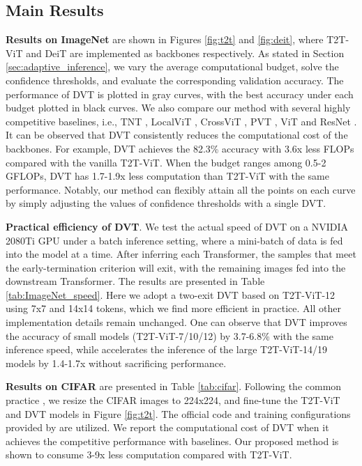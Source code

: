 \documentclass{article}
\begin{document}
\vspace{-1.5ex}
\subsection{Main Results}
\vspace{-1.5ex}

\textbf{Results on ImageNet}
are shown in Figures \ref{fig:t2t} and \ref{fig:deit}, where T2T-ViT \cite{yuan2021tokens} and DeiT \cite{touvron2020training} are implemented as backbones respectively. As stated in Section \ref{sec:adaptive_inference}, we vary the average computational budget, solve the confidence thresholds, and evaluate the corresponding validation accuracy. The performance of DVT is plotted in gray curves, with the best accuracy under each budget plotted in black curves. We also compare our method with several highly competitive baselines, i.e., TNT \cite{han2021transformer}, LocalViT \cite{li2021localvit}, CrossViT \cite{chen2021crossvit}, PVT \cite{wang2021pyramid}, ViT \cite{dosovitskiy2021an} and ResNet \cite{He_2016_CVPR}. It can be observed that DVT consistently reduces the computational cost of the backbones. For example, DVT achieves the 82.3\% accuracy with 3.6x less FLOPs compared with the vanilla T2T-ViT. When the budget ranges among 0.5-2 GFLOPs, DVT has 1.7-1.9x less computation than T2T-ViT with the same performance. Notably, our method can flexibly attain all the points on each curve by simply adjusting the values of confidence thresholds with a single DVT.


\textbf{Practical efficiency of DVT}.
We test the actual speed of DVT on a NVIDIA 2080Ti GPU under a batch inference setting, where a mini-batch of data is fed into the model at a time. After inferring each Transformer, the samples that meet the early-termination criterion will exit, with the remaining images fed into the downstream Transformer. The results are presented in Table \ref{tab:ImageNet_speed}. Here we adopt a two-exit DVT based on T2T-ViT-12 using 7x7 and 14x14 tokens, which we find more efficient in practice. All other implementation details remain unchanged. One can observe that DVT improves the accuracy of small models (T2T-ViT-7/10/12) by 3.7-6.8\% with the same inference speed, while accelerates the inference of the large T2T-ViT-14/19 models by 1.4-1.7x without sacrificing performance.


\textbf{Results on CIFAR}
are presented in Table \ref{tab:cifar}. Following the common practice \cite{dosovitskiy2021an, yuan2021tokens, han2021transformer, touvron2020training}, we resize the CIFAR images to 224x224, and fine-tune the T2T-ViT and DVT models in Figure \ref{fig:t2t}. The official code and training configurations provided by \cite{yuan2021tokens} are utilized. We report the computational cost of DVT when it achieves the competitive performance with baselines. Our proposed method is shown to consume 3-9x less computation compared with T2T-ViT.
\end{document}
